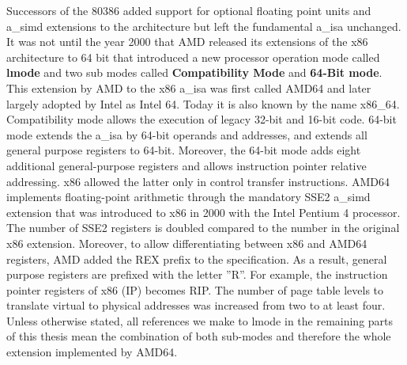 Successors of the 80386 added support for optional floating point units and
\acrshort{a_simd} extensions to the architecture but left the fundamental
\acrshort{a_isa} unchanged. It was not until the year 2000 that AMD released its
extensions of the x86 architecture to 64 bit that introduced a new processor
operation mode called \textbf{\gls{lmode}} and two sub modes called
\textbf{Compatibility Mode} and \textbf{64-Bit mode}. This extension by AMD to
the x86 \acrshort{a_isa} was first called AMD64 and later largely adopted by
Intel as Intel 64. Today it is also known by the name x86\_64. Compatibility
mode allows the execution of legacy 32-bit and 16-bit code. 64-bit mode extends
the \acrshort{a_isa} by 64-bit operands and addresses, and extends all general
purpose registers to 64-bit. Moreover, the 64-bit mode adds eight additional
general-purpose registers and allows instruction pointer relative addressing.
x86 allowed the latter only in control transfer instructions. AMD64 implements
floating-point arithmetic through the mandatory SSE2 \acrshort{a_simd} extension
that was introduced to x86 in 2000 with the Intel Pentium 4 processor. The
number of SSE2 registers is doubled compared to the number in the original x86
extension. Moreover, to allow differentiating between x86 and AMD64 registers,
AMD added the REX prefix to the specification. As a result, general purpose
registers are prefixed with the letter ''R''. For example, the instruction
pointer registers of x86 (IP) becomes RIP. The number of page table levels to
translate virtual to physical addresses was increased from two to at least
four.\\

Unless otherwise stated, all references we make to \gls{lmode} in the remaining
parts of this thesis mean the combination of both sub-modes and therefore the
whole extension implemented by AMD64.

